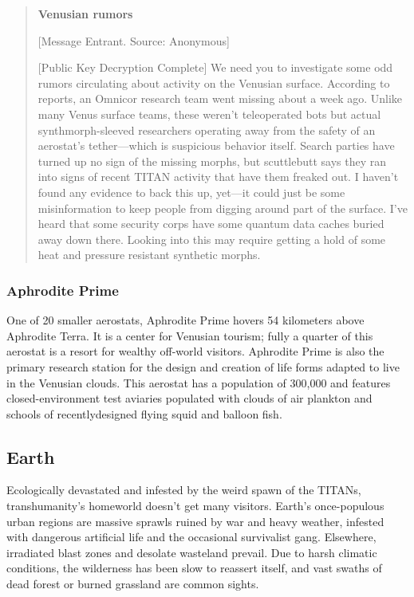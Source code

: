 \begin{quotation} \textbf{Venusian rumors} 

[Message Entrant. Source: Anonymous] 

[Public Key Decryption Complete] We need you to investigate some odd rumors circulating about activity on the Venusian surface. According to reports, an Omnicor research team went missing about a week ago. Unlike many Venus surface teams, these weren't teleoperated bots but actual synthmorph-sleeved researchers operating away from the safety of an aerostat's tether—which is suspicious behavior itself. Search parties have turned up no sign of the missing morphs, but scuttlebutt says they ran into signs of recent TITAN activity that have them freaked out. I haven't found any evidence to back this up, yet—it could just be some misinformation to keep people from digging around part of the surface. I've heard that some security corps have some quantum data caches buried away down there. Looking into this may require getting a hold of some heat and pressure resistant synthetic morphs. \end{quotation} 

\subsubsection{Aphrodite Prime} \label{sec:aphrodite-prime} 

One of 20 smaller aerostats, Aphrodite Prime hovers 54 kilometers above Aphrodite Terra. It is a center for Venusian tourism; fully a quarter of this aerostat is a resort for wealthy off-world visitors. Aphrodite Prime is also the primary research station for the design and creation of life forms adapted to live in the Venusian clouds. This aerostat has a population of 300,000 and features closed-environment test aviaries populated with clouds of air plankton and schools of recentlydesigned flying squid and balloon fish. 

\subsection{Earth} \label{sec:earth} 

Ecologically devastated and infested by the weird spawn of the TITANs, transhumanity's homeworld doesn't get many visitors. Earth's once-populous urban regions are massive sprawls ruined by war and heavy weather, infested with dangerous artificial life and the occasional survivalist gang. Elsewhere, irradiated blast zones and desolate wasteland prevail. Due to harsh climatic conditions, the wilderness has been slow to reassert itself, and vast swaths of dead forest or burned grassland are common sights. 

